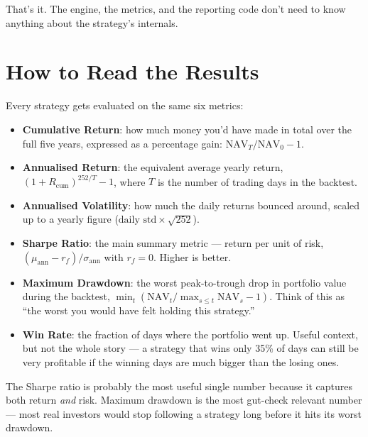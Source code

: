\documentclass[11pt,a4paper]{article}
\begin{document}
That's it. The engine, the metrics, and the reporting code don't need to know
anything about the strategy's internals.

\section{How to Read the Results}

Every strategy gets evaluated on the same six metrics:

\begin{itemize}[leftmargin=*]
    \item \textbf{Cumulative Return}: how much money you'd have made in total
          over the full five years, expressed as a percentage gain:
          $\text{NAV}_T / \text{NAV}_0 - 1$.

    \item \textbf{Annualised Return}: the equivalent average yearly return,
          $(1 + R_{\text{cum}})^{252/T} - 1$, where $T$ is the number of
          trading days in the backtest.

    \item \textbf{Annualised Volatility}: how much the daily returns bounced
          around, scaled up to a yearly figure ($\text{daily std} \times \sqrt{252}$).

    \item \textbf{Sharpe Ratio}: the main summary metric --- return per unit of
          risk, $(\mu_{\text{ann}} - r_f) / \sigma_{\text{ann}}$ with $r_f = 0$.
          Higher is better.

    \item \textbf{Maximum Drawdown}: the worst peak-to-trough drop in portfolio
          value during the backtest,
          $\min_t (\text{NAV}_t / \max_{s \le t} \text{NAV}_s - 1)$.
          Think of this as ``the worst you would have felt holding this strategy.''

    \item \textbf{Win Rate}: the fraction of days where the portfolio went up.
          Useful context, but not the whole story --- a strategy that wins
          only 35\% of days can still be very profitable if the winning days
          are much bigger than the losing ones.
\end{itemize}

The Sharpe ratio is probably the most useful single number because it captures
both return \emph{and} risk.
Maximum drawdown is the most gut-check relevant number --- most real investors
would stop following a strategy long before it hits its worst drawdown.
\end{document}
